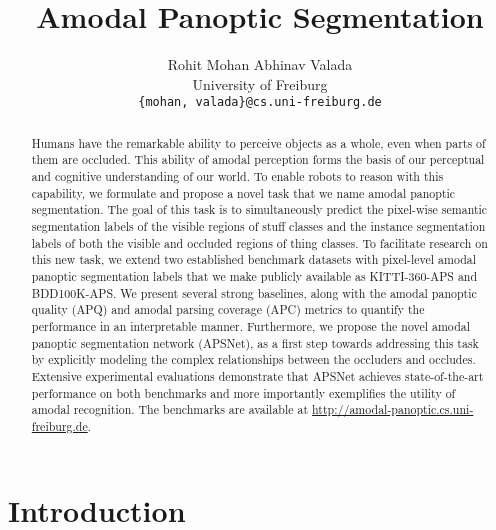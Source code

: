 \documentclass[10pt,twocolumn,letterpaper]{article}
\begin{document}
\title{Amodal Panoptic Segmentation}

\author{Rohit Mohan
\qquad
Abhinav Valada\\
University of Freiburg\\
\tt\small\{mohan, valada\}@cs.uni-freiburg.de}

\maketitle

\begin{abstract}
   Humans have the remarkable ability to perceive objects as a whole, even when parts of them are occluded. This ability of amodal perception forms the basis of our perceptual and cognitive understanding of our world. To enable robots to reason with this capability, we formulate and propose a novel task that we name amodal panoptic segmentation. The goal of this task is to simultaneously predict the pixel-wise semantic segmentation labels of the visible regions of stuff classes and the instance segmentation labels of both the visible and occluded regions of thing classes. To facilitate research on this new task, we extend two established benchmark datasets with pixel-level amodal panoptic segmentation labels that we make publicly available as KITTI-360-APS and BDD100K-APS. We present several strong baselines, along with the amodal panoptic quality (APQ) and amodal parsing coverage (APC) metrics to quantify the performance in an interpretable manner. Furthermore, we propose the novel amodal panoptic segmentation network (APSNet), as a first step towards addressing this task by explicitly modeling the complex relationships between the occluders and occludes. Extensive experimental evaluations demonstrate that APSNet achieves state-of-the-art performance on both benchmarks and more importantly exemplifies the utility of amodal recognition. The benchmarks are available at \url{http://amodal-panoptic.cs.uni-freiburg.de}.
\end{abstract}

\section{Introduction}\label{sec:intro}
\end{document}
